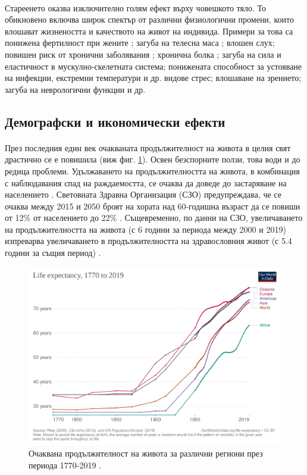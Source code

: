 \documentclass[pdftex,cyrillic,14pt,a4page,twoside]{extreport}
\begin{document}
\paragraph{}
Стареенето оказва изключително голям ефект върху човешкото тяло. То обикновено включва широк спектър от различни физиологични промени, които влошават жизнеността и качеството на живот на индивида. Примери за това са понижена фертилност при жените \cite{kamath2010}; загуба на телесна маса \cite{spencer1996}; влошен слух\cite{feder2015}; повишен риск от хронични заболявания \cite{larson2013}\cite{prasad2012}; хронична болка \cite{geriatrics2002}; загуба на сила и еластичност в мускулно-скелетната система; понижената способност за устояване на инфекции, екстремни температури и др. видове стрес; влошаване на зрението; загуба на неврологични функции \cite{vina2007} и др.


\subsection{Демографски и икономически ефекти}
\paragraph{}
През последния един век очакваната продължителност на живота в целия свят драстично се е повишила \cite{zijdeman2016} (виж фиг. \ref{fig:life_expectancy}). Освен безспорните ползи, това води и до редица проблеми. Удължаването на продължителността на живота, в комбинация с наблюдавания спад на раждаемостта, се очаква да доведе до застаряване на населението \cite{lutz2008}. Световната Здравна Организация (СЗО) предупреждава, че се очаква между 2015 и 2050 броят на хората над 60-годишна възраст да се повиши от 12\% от населението до 22\% \cite{who_report_ageing2015}. Същевременно, по данни на СЗО, увеличаването на продължителността на живота (с 6 години за периода между 2000 и 2019) изпреварва увеличаването в продължителността на здравословния живот (с 5.4 години за същия период) \cite{who_health2020}. \\
\begin{figure}[h]
  \centering
  \includegraphics[width=12cm]{figures/life-expectancy}
  \caption {Очаквана продължителност на живота за различни региони през периода 1770-2019 \cite{zijdeman2016}.}
  \label{fig:life_expectancy}
\end{figure}
\end{document}
